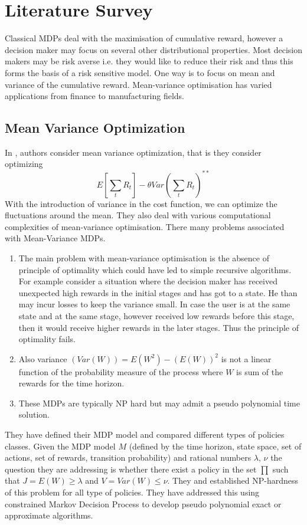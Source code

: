 \documentclass[12pt,a4paper,oneside]{report}
\begin{document}
\chapter{Literature Survey}


\noindent Classical MDPs deal with the maximisation of cumulative reward, however a decision maker may focus on several other distributional properties. Most decision makers may be risk averse i.e. they would like to reduce their risk and thus this forms the basis of a risk sensitive model. 
One way is to focus on mean and variance of the cumulative reward. Mean-variance optimisation has varied applications from finance to manufacturing fields.\\

\section{Mean Variance Optimization}
In \cite{mannor2011mean}, authors consider mean variance optimization, that is they consider optimizing 
\begin{equation}
E[\sum_t R_t] - \theta Var(\sum_t R_t) ^{**}
\end{equation}
With the introduction of variance in the cost function, we can optimize the fluctuations around the mean. They also deal with various computational complexities of mean-variance optimisation. There many problems associated with Mean-Variance MDPs.
\begin{enumerate}
\item The main problem with mean-variance optimisation is the absence of principle of optimality which could have led to simple recursive algorithms. For example consider a situation where the decision maker has received unexpected high rewards in the initial stages and has got to a state. He than may incur losses to keep the variance small. In case the user is at the same state and at the same stage, however received low rewards before this stage, then it would receive higher rewards in the later stages. Thus the principle of optimality fails. 
\item Also variance $ (Var(W))=E(W^2)- (E(W))^2$ is not a linear function of the probability measure of the process where $W$ is sum of the rewards for the time horizon.
\item These MDPs are typically NP hard but may admit a pseudo polynomial time solution.
\end{enumerate} 
They have defined their MDP model and compared different types of policies classes. Given the MDP model $M$ (defined by the time horizon, state space, set of actions, set of rewards, transition probability) and rational numbers $\lambda$, $\nu$ the question they are addressing is whether there exist a policy in the set  ${\prod}$ such that $J=E(W)\geq \lambda$ and $V=Var(W)\leq \nu$. They  and established NP-hardness of this problem for all type of policies. They have addressed this using constrained Markov Decision Process to develop pseudo polynomial exact or approximate algorithms.
\end{document}
